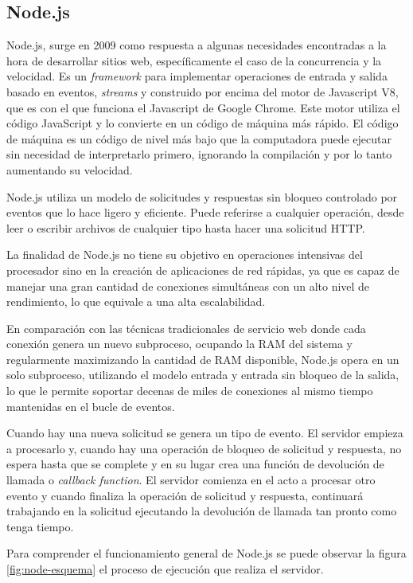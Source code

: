 \subsection{Node.js}

Node.js,  surge en 2009 como respuesta a algunas necesidades encontradas a la hora de desarrollar sitios web, específicamente el caso de la concurrencia y la velocidad.  Es un \textit{framework} para implementar operaciones de entrada y salida basado en eventos, \textit{streams} y construido por encima del motor de Javascript V8\citep{WEBSITE:21}, que es con el que funciona el Javascript de Google Chrome. Este motor utiliza el código JavaScript y lo convierte en un código de máquina más rápido. El código de máquina es un código de nivel más bajo que la computadora puede ejecutar sin necesidad de interpretarlo primero, ignorando la compilación y por lo tanto aumentando su velocidad. 

Node.js utiliza un modelo de solicitudes y respuestas sin bloqueo controlado por eventos que lo hace ligero y eficiente. Puede referirse a cualquier operación, desde leer o escribir archivos de cualquier tipo hasta hacer una solicitud HTTP. 

La finalidad de Node.js no tiene su objetivo en operaciones intensivas del procesador sino en la creación de aplicaciones de red rápidas, ya que es capaz de manejar una gran cantidad de conexiones simultáneas con un alto nivel de rendimiento, lo que equivale a una alta escalabilidad. 

En comparación con las técnicas tradicionales de servicio web donde cada conexión genera un nuevo subproceso, ocupando la RAM del sistema y regularmente maximizando la cantidad de RAM disponible, Node.js opera en un solo subproceso, utilizando el modelo entrada y entrada sin bloqueo de la salida, lo que le permite soportar decenas de miles de conexiones al mismo tiempo mantenidas en el bucle de eventos.

Cuando hay una nueva solicitud se genera un tipo de evento. El servidor empieza a procesarlo y, cuando hay una operación de bloqueo de solicitud y respuesta, no espera hasta que se complete y en su lugar crea una función de devolución de llamada o \textit{callback function}. El servidor comienza en el acto a procesar otro evento y cuando finaliza la operación de solicitud y respuesta, continuará trabajando en la solicitud ejecutando la devolución de llamada tan pronto como tenga tiempo. 

Para comprender el funcionamiento general de Node.js se puede observar la figura \ref{fig:node-esquema} el proceso de ejecución que realiza el servidor.

